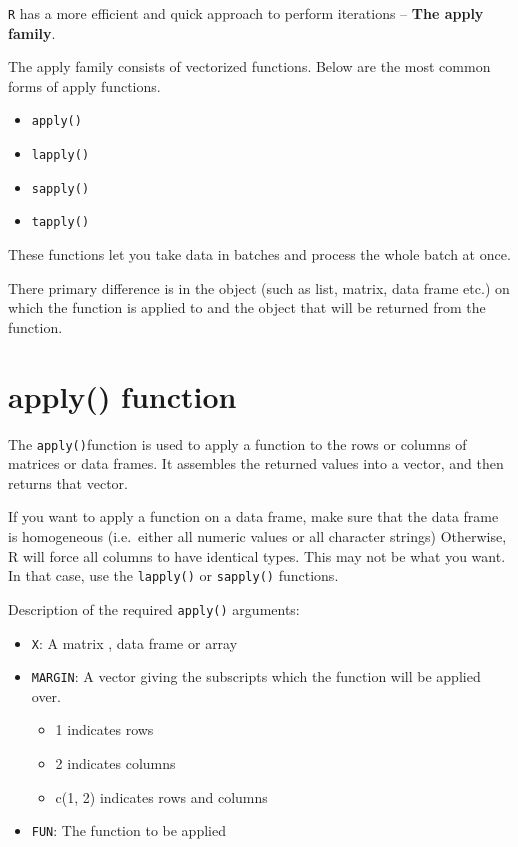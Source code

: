 \documentclass[
]{book}
\providecommand{\tightlist}{%
  \setlength{\itemsep}{0pt}\setlength{\parskip}{0pt}}
\begin{document}
\texttt{R} has a more efficient and quick approach to perform iterations -- \textbf{The apply family}.

The apply family consists of vectorized functions. Below are the most common forms of apply functions.

\begin{itemize}
\tightlist
\item
  \texttt{apply()}
\item
  \texttt{lapply()}
\item
  \texttt{sapply()}
\item
  \texttt{tapply()}
\end{itemize}

These functions let you take data in batches and process the whole batch at once.

There primary difference is in the object (such as list, matrix, data frame etc.) on which the function is applied to and the object that will be returned from the function.

\hypertarget{apply-function}{%
\section{apply() function}\label{apply-function}}

The \texttt{apply()}function is used to apply a function to the rows or columns of matrices or data frames. It assembles the returned values into a vector, and then returns that vector.

If you want to apply a function on a data frame, make sure that the data frame is homogeneous (i.e.~either all numeric values or all character strings) Otherwise, R will force all columns to have identical types. This may not be what you want. In that case, use the \texttt{lapply()} or \texttt{sapply()} functions.

Description of the required \texttt{apply()} arguments:

\begin{itemize}
\tightlist
\item
  \texttt{X}: A matrix , data frame or array
\item
  \texttt{MARGIN}: A vector giving the subscripts which the function will be applied over.

  \begin{itemize}
  \tightlist
  \item
    1 indicates rows
  \item
    2 indicates columns
  \item
    c(1, 2) indicates rows and columns
  \end{itemize}
\item
  \texttt{FUN}: The function to be applied
\end{itemize}
\end{document}
